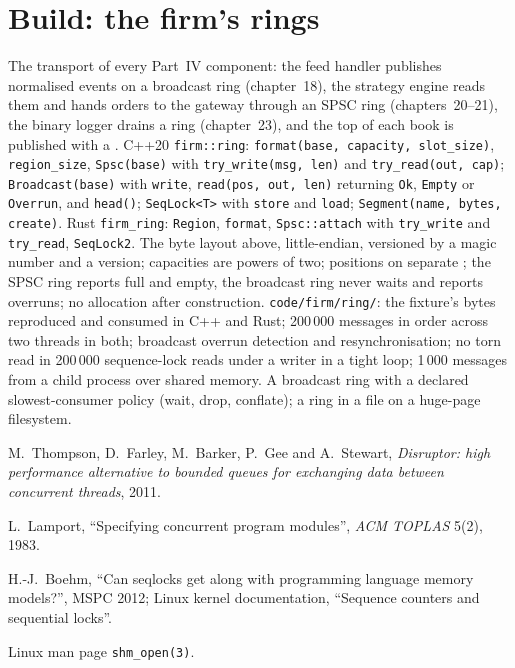 \section{Build: the firm's rings}\label{bld:ll:queues-ring-buffers-and-shared-memory:ring}

\begin{build}
 The transport of every Part~IV component: the feed handler publishes normalised events on a broadcast ring
(chapter~18), the strategy engine reads them and hands orders to the gateway through an SPSC ring (chapters~20--21), the binary
logger drains a ring (chapter~23), and the top of each book is published with a .
 C++20 \texttt{firm::ring}: \texttt{format(base, capacity, slot\_size)}, \texttt{region\_size},
\texttt{Spsc(base)} with \texttt{try\_write(msg, len)} and \texttt{try\_read(out, cap)}; \texttt{Broadcast(base)} with
\texttt{write}, \texttt{read(pos, out, len)} returning \texttt{Ok}, \texttt{Empty} or \texttt{Overrun}, and \texttt{head()};
\texttt{SeqLock<T>} with \texttt{store} and \texttt{load}; \texttt{Segment(name, bytes, create)}. Rust \texttt{firm\_ring}:
\texttt{Region}, \texttt{format}, \texttt{Spsc::attach} with \texttt{try\_write} and \texttt{try\_read}, \texttt{SeqLock2}.
 The byte layout above, little-endian, versioned by a magic number and a version; capacities are powers of two;
positions on separate ; the SPSC ring reports full and empty, the broadcast ring never waits and reports overruns;
no allocation after construction.
 \texttt{code/firm/ring/}: the fixture's bytes reproduced and consumed in C++ and Rust; 200\,000
messages in order across two threads in both; broadcast overrun detection and resynchronisation; no torn read in 200\,000
sequence-lock reads under a writer in a tight loop; 1\,000 messages from a child process over shared memory.
 A broadcast ring with a declared slowest-consumer policy (wait, drop, conflate); a ring in a file on a huge-page
filesystem.
\end{build}

\begin{omsources}
\item M.~Thompson, D.~Farley, M.~Barker, P.~Gee and A.~Stewart, \emph{Disruptor: high performance alternative to bounded queues
for exchanging data between concurrent threads}, 2011.
\item L.~Lamport, ``Specifying concurrent program modules'', \emph{ACM TOPLAS} 5(2), 1983.
\item H.-J.~Boehm, ``Can seqlocks get along with programming language memory models?'', MSPC 2012; Linux kernel documentation,
``Sequence counters and sequential locks''.
\item Linux man page \texttt{shm\_open(3)}.
\end{omsources}


